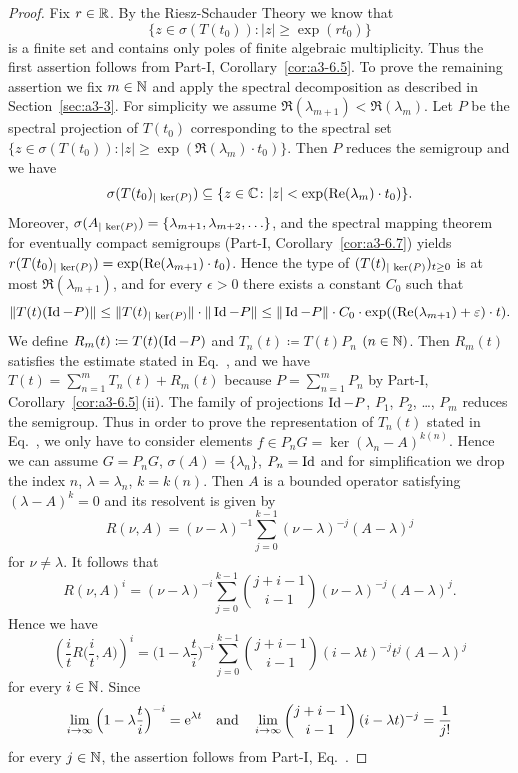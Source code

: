 \begin{proof}
	Fix $r \in \mathbb{R}$.
	By the Riesz-Schauder Theory we know that
	\[
    \{z \in \sigma(T(t_{0})) \colon |z| \geq \exp(rt_{0})\}
    \]
    is a finite set and contains only
	poles of finite algebraic multiplicity.
	Thus the first assertion
	follows from Part-I, Corollary~\ref{cor:a3-6.5}.
	To prove the remaining assertion we fix $m \in \mathbb{N}$ and apply the spectral
	decomposition as described in Section~\ref{sec:a3-3}.
	For simplicity we assume $\Re(\lambda_{m+1}) < \Re(\lambda_m)$.
	Let $P$ be the spectral projection
	of\/ $T(t_{0})$ corresponding to the spectral set $\{z \in \sigma(T(t_{0})) \colon
	|z| \geq \exp(\Re(\lambda_m) \cdot t_{0})\}$.
	Then $P$ reduces the semigroup and we have
	\[
	\sigma(T(t_{0})_{\vert \mathop{}\mathrm{ker}(P)}) \subseteq \{z \in \mathbb{C} \colon |z| < \exp(\mathop{}\!\mathrm{Re}(\lambda_m) \cdot t_{0})\} .
\]
%
	Moreover, $\sigma(A_{\vert \mathop{}\mathrm{ker}(P)}) = \{\lambda_{m+1},\lambda_{m+2},\ldots\}$, and the spectral mapping theorem for eventually compact semigroups (Part-I, Corollary~\ref{cor:a3-6.7}) yields $r(T(t_{0})_{\vert \mathop{}\mathrm{ker}(P)}) = \exp(\mathop{}\!\mathrm{Re}(\lambda_{m+1}) \cdot t_{0})$.
	Hence the type of
	$(T(t)_{\vert \Kern{P}})_{t \geq 0}$ is at most $\Re(\lambda_{m+1})$, and for every $\epsilon > 0$ there exists a constant $C_{0}$ such that
\[
\|T(t)(\Id -P)\| \leq \|T(t)_{\vert \Kern{P}}\|\cdot\|\Id -P\| \leq \|\Id -P\|\cdot C_{0} \cdot \exp((\Re(\lambda_{m+1})+\epsilon) \cdot t) .
\]
We define $R_m(t)  \coloneq  T(t)(\operatorname{Id} -P)$ and $T_n(t)  \coloneq  T(t)P_n$ $(n \in \mathbb{N})$.
Then $R_m(t)$ satisfies the estimate stated in Eq.~, and we have $T(t) =
\sum_{n=1}^m T_n(t) + R_m(t)$ because $P = \sum_{n=1}^m P_n$ by Part-I, Corollary~\ref{cor:a3-6.5}\,(ii).
The family of projections $\operatorname{Id} -P$, $P_1$, $P_2$, \ldots , $P_m$ reduces the semigroup.
Thus in order to prove the representation of\/ $T_n(t)$ stated in
Eq.~, we only have to consider elements $f \in P_n G = \ker(\lambda_n-A)^{k(n)}$.
Hence we can assume $G = P_n G$, $\sigma(A) = \{\lambda_n\}$, $P_n = \operatorname{Id} $ and for simplification
we drop the index $n$, \ie  $\lambda = \lambda_n$, $k = k(n)$.
Then $A$ is a bounded operator satisfying $(\lambda - A)^k = 0$ and its resolvent is given by
%
\[
	R(\nu,A) = (\nu-\lambda)^{-1}\sum_{j=0}^{k-1}(\nu-\lambda)^{-j}(A-\lambda)^j
\]
%
for $\nu \neq \lambda$.
It follows that
%
\[
	 R(\nu,A)^i = (\nu-\lambda)^{-i}\sum_{j=0}^{k-1}\binom{j+i-1}{i-1}(\nu-\lambda)^{-j}(A-\lambda)^j .
\]
Hence we have
\[
\left(\frac{i}{t}R\Big(\frac{i}{t},A\Big)\right)^i = \Big(1-\lambda\frac{t}{i}\Big)^{-i}\sum_{j=0}^{k-1}\binom{j+i-1}{i-1}(i-\lambda t)^{-j}t^j(A-\lambda)^j 
\]
for every $i \in \mathbb{N}$.
Since 
%
\[
\lim_{i\to\infty}\Big(1-\lambda\frac{t}{i}\Big)^{-i} = \mathrm{e}^{\lambda t}
\quad \text{and} \quad \lim_{i\to\infty}\binom{j+i-1}{i-1}\,(i-\lambda t)^{-j} = \frac{1}{j!}
\]
%
for every $j \in \mathbb{N}$, the assertion follows from Part-I, Eq.~.
\end{proof}

